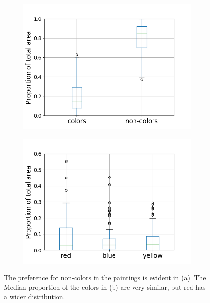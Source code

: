 \documentclass[serif,article,noparskip]{agse-thesis}
\begin{document}
\begin{figure}
\centering
\begin{subfigure}{.5\textwidth}
  \includegraphics[width=\linewidth]{images/colors-non-colors.png}
  \caption{ }
  \label{fig:colors-noncolors}
\end{subfigure}%
\begin{subfigure}{.5\textwidth}
  \centering
  \includegraphics[width=\linewidth]{images/colors-rby.png}
  \caption{ }
  \label{fig:colors-rby}
\end{subfigure}
\caption{The preference for non-colors in the paintings is evident in (a).
The Median proportion of the colors in (b) are very similar, but red has a
wider distribution.}
\end{figure}
\end{document}
